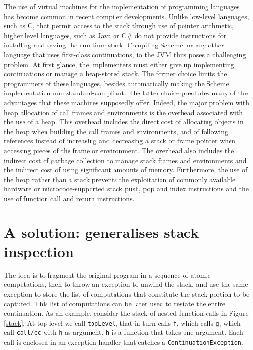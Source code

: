 \documentclass[12pt,a4paper,oneside,openright]{book}
\begin{document}
The use of virtual machines for the implementation of programming
languages has become common in recent compiler developments. Unlike
low-level languages, such as C, that permit access to the stack through
use of pointer arithmetic, higher level languages, such as Java or C\#
do not provide instructions for installing and saving the run-time
stack. Compiling Scheme, or any other language that uses first-class
continuations, to the JVM thus poses a challenging problem. At first
glance, the implementers must either give up implementing continuations
or manage a heap-stored stack. The former choice limits the programmers
of these languages, besides automatically making the Scheme
implementation non standard-compliant. The latter choice precludes many
of the advantages that these machines supposedly offer. Indeed, the
major problem with heap allocation of call frames and environments is
the overhead associated with the use of a heap. This overhead includes
the direct cost of allocating objects in the heap when building the call
frames and environments, and of following references instead of
increasing and decreasing a stack or frame pointer when accessing pieces
of the frame or environment. The overhead also includes the indirect
cost of garbage collection to manage stack frames and environments and
the indirect cost of using significant amounts of memory. Furthermore,
the use of the heap rather than a stack prevents the exploitation of
commonly available hardware or microcode-supported stack push, pop and
index instructions and the use of function call and return instructions.

\section{A solution: generalises stack
inspection}\label{a-solution-generalises-stack-inspection}

The idea is to fragment the original program in a sequence of atomic
computations, then to throw an exception to unwind the stack, and use
the same exception to store the list of computations that constitute the
stack portion to be captured. This list of computations can be later
used to restate the entire continuation. As an example, consider the
stack of nested function calls in Figure \ref{stack}. At top level we
call \texttt{topLevel}, that in turn calls \texttt{f}, which calls
\texttt{g}, which call \texttt{call/cc} with \texttt{h} as argument.
\texttt{h} is a function that takes one argument. Each call is enclosed
in an exception handler that catches a \texttt{ContinuationException}.
\end{document}
